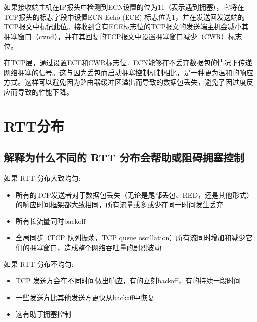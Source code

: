 如果接收端主机在IP报头中检测到ECN设置的位为11（表示遇到拥塞），它将在TCP报头的标志字段中设置ECN-Echo (ECE) 标志位为1，并在发送回发送端的TCP报文中标记此位。接收到含有ECE标志位的TCP报文的发送端主机会减小其拥塞窗口（cwnd），并在其回复的TCP报文中设置拥塞窗口减少（CWR）标志位。

在TCP层，通过设置ECE和CWR标志位，ECN能够在不丢弃数据包的情况下传递网络拥塞的信号。这与因为丢包而启动拥塞控制机制相比，是一种更为温和的响应方式。这样可以避免因为路由器缓冲区溢出而导致的数据包丢失，避免了因过度反应而导致的性能下降。

\section{RTT分布}

\subsection{解释为什么不同的 RTT 分布会帮助或阻碍拥塞控制}

如果 RTT 分布大致均匀:

\begin{itemize}
	\item 所有的TCP发送者对于数据包丢失（无论是尾部丢包、RED，还是其他形式）的响应时间框架都大致相同，所有流量或多或少在同一时间发生丢弃
	\item 所有长流量同时backoff
	\item 全局同步（TCP 队列振荡，TCP queue oscillation）所有流同时增加和减少它们的拥塞窗口，造成整个网络吞吐量的剧烈波动
\end{itemize}


如果 RTT 分布不均匀:

\begin{itemize}
	\item TCP 发送方会在不同时间做出响应，有的立刻backoff，有的持续一段时间
	\item 一些发送方比其他发送方更快从backoff中恢复
	\item 这有助于拥塞控制
\end{itemize}












































